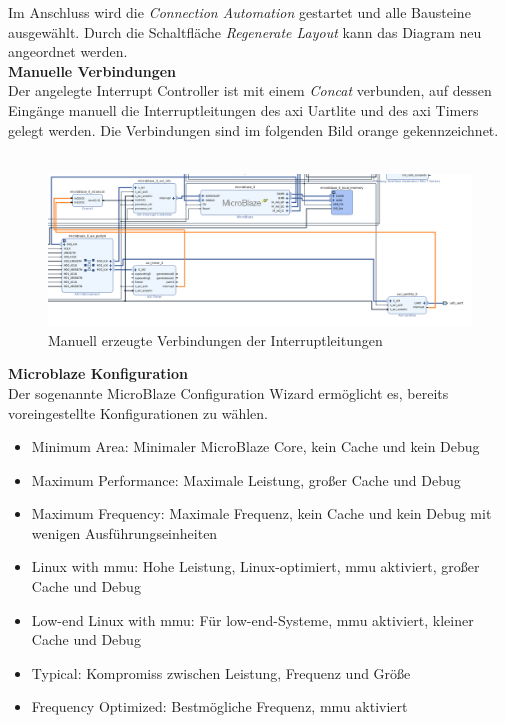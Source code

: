 Im Anschluss wird die \emph{Connection Automation} gestartet und alle Bausteine ausgewählt.
Durch die Schaltfläche \emph{Regenerate Layout} kann das Diagram neu angeordnet werden.\\

\textbf{Manuelle Verbindungen}\\

Der angelegte Interrupt Controller ist mit einem \emph{Concat} verbunden, auf dessen Eingänge manuell die Interruptleitungen des \ac{axi} Uartlite und des \ac{axi} Timers gelegt werden.
Die Verbindungen sind im folgenden Bild orange gekennzeichnet.\\\\

\begin{figure}[H]
\centering
\includegraphics[width=1\textwidth]{Hauptteil/Schritt8.png}
\caption{Manuell erzeugte Verbindungen der Interruptleitungen}\label{fig:mbschritt8}
\end{figure}

\newpage

\textbf{Microblaze Konfiguration}\\

Der sogenannte MicroBlaze Configuration Wizard ermöglicht es, bereits voreingestellte Konfigurationen zu wählen.

\begin{itemize}
  \item Minimum Area: Minimaler MicroBlaze Core, kein Cache und kein Debug
  \item Maximum Performance: Maximale Leistung, großer Cache und Debug
  \item Maximum Frequency: Maximale Frequenz, kein Cache und kein Debug mit wenigen Ausführungseinheiten
  \item Linux with \ac{mmu}: Hohe Leistung, Linux-optimiert, \ac{mmu} aktiviert, großer Cache und Debug
  \item Low-end Linux with \ac{mmu}: Für low-end-Systeme, \ac{mmu} aktiviert, kleiner Cache und Debug
  \item Typical: Kompromiss zwischen Leistung, Frequenz und Größe
  \item Frequency Optimized: Bestmögliche Frequenz, \ac{mmu} aktiviert
\end{itemize}


